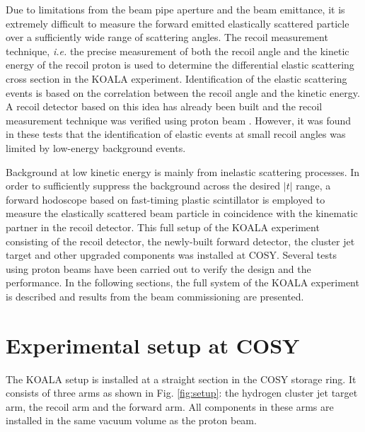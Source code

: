 \documentclass[number,5p]{elsarticle}
\begin{document}
Due to limitations from the beam pipe aperture and the beam emittance,
it is extremely difficult to measure the forward emitted elastically scattered
particle over a sufficiently wide range of scattering angles.
The recoil measurement technique, \textit{i.e.} the precise measurement of both the recoil angle and the kinetic energy of the recoil proton is used to determine the differential elastic scattering cross section in the
KOALA experiment.
Identification of the elastic scattering events is based on the correlation between the recoil angle and the kinetic energy.
A recoil detector based on this idea has already been built and the recoil measurement technique was verified using proton beam
\cite{koala_article,recoil_article}.
However, it was found in these tests that the identification of elastic events at small recoil angles was limited by low-energy background events.

Background at low kinetic energy is mainly from inelastic scattering processes.
In order to sufficiently suppress the background across the desired $|t|$ range,
a forward hodoscope based on fast-timing plastic scintillator is employed
to measure the elastically scattered beam particle in coincidence with the kinematic partner in the recoil detector.
This full setup of the KOALA experiment consisting of the recoil detector, the newly-built
forward detector, the cluster jet target and other upgraded components was installed at COSY.
Several tests using proton beams have been carried out to verify the design and the performance.
In the following sections,  the full system of the KOALA experiment is described and results from the beam commissioning are presented.

\section{Experimental setup at COSY}
\label{sec:setup}

The KOALA setup is installed at a straight section in the COSY storage ring.
It consists of three arms as shown in Fig. \ref{fig:setup}: the hydrogen
cluster jet target arm, the recoil arm and the forward arm.
All components in these arms are installed in the same vacuum volume as the
proton beam.
\end{document}
